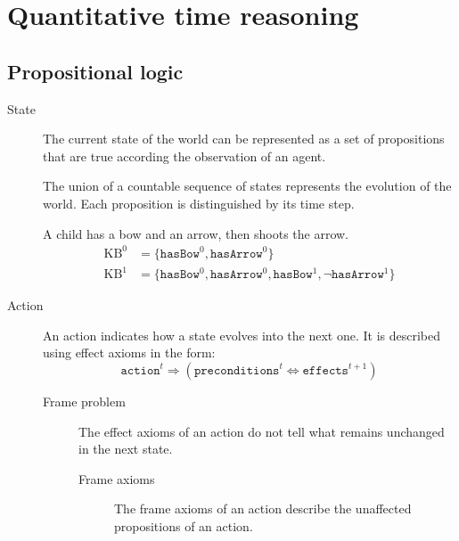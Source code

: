 \chapter{Quantitative time reasoning}


\section{Propositional logic}

\begin{description}
    \item[State]  
        The current state of the world can be represented as a set of propositions that are true according the observation of an agent.

        The union of a countable sequence of states represents the evolution of the world. Each proposition is distinguished by its time step.

        \begin{example}
            A child has a bow and an arrow, then shoots the arrow.
            \[
                \begin{split}
                    \text{KB}^0 &= \{ \texttt{hasBow}^0, \texttt{hasArrow}^0  \} \\
                    \text{KB}^1 &= \{ \texttt{hasBow}^0, \texttt{hasArrow}^0, \texttt{hasBow}^1, \lnot\texttt{hasArrow}^1  \} 
                \end{split}
            \]
        \end{example}

    \item[Action] 
        An action indicates how a state evolves into the next one.
        It is described using effect axioms in the form:
        \[ \texttt{action}^t \Rightarrow (\texttt{preconditions}^t \iff \texttt{effects}^{t+1}) \]

        \begin{description}
            \item[Frame problem] 
                The effect axioms of an action do not tell what remains unchanged in the next state.

            \begin{description}
                \item[Frame axioms] 
                    The frame axioms of an action describe the unaffected propositions of an action.
            \end{description}
        \end{description}


\end{description}

